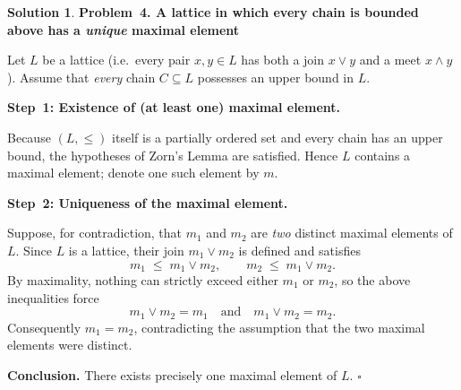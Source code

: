 \documentclass[12pt]{article}
\theoremstyle{definition} %
\newtheorem{solution}{Solution}
\theoremstyle{plain} %
\begin{document}
  \begin{solution}
    \textbf{Problem 4.  A lattice in which every chain is bounded above
    has a \emph{unique} maximal element}
    
    Let \(L\) be a lattice (i.e.\ every pair \(x,y\in L\) has both a join
    \(x\vee y\) and a meet \(x\wedge y\)).
    Assume that \emph{every} chain \(C\subseteq L\) possesses an upper
    bound in \(L\).
    
    \medskip
    \textbf{Step 1:  Existence of (at least one) maximal element.}
    
    Because \((L,\le)\) itself is a partially ordered set and every chain
    has an upper bound, the hypotheses of Zorn’s Lemma are satisfied.
    Hence \(L\) contains a maximal element; denote one such element by
    \(m\).
    
    \medskip
    \textbf{Step 2:  Uniqueness of the maximal element.}
    
    Suppose, for contradiction, that \(m_1\) and \(m_2\) are \emph{two}
    distinct maximal elements of \(L\).
    Since \(L\) is a lattice, their join \(m_1\vee m_2\) is defined
    and satisfies
    \[
          m_1 \;\le\; m_1\vee m_2,
          \qquad
          m_2 \;\le\; m_1\vee m_2.
    \]
    By maximality, nothing can strictly exceed either \(m_1\) or \(m_2\),
    so the above inequalities force
    \[
          m_1\vee m_2 = m_1
          \quad\text{and}\quad
          m_1\vee m_2 = m_2.
    \]
    Consequently \(m_1 = m_2\), contradicting the assumption that the two
    maximal elements were distinct.
    
    \medskip
    \textbf{Conclusion.}
    There exists precisely one maximal element of \(L\).
    \(\square\)
    \end{solution}
\end{document}
